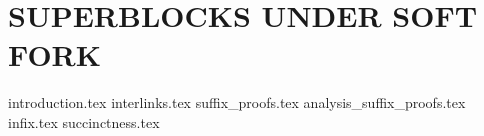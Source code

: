 \chapter{SUPERBLOCKS UNDER SOFT FORK}

{introduction.tex} 
{interlinks.tex} 
{suffix_proofs.tex}
{analysis_suffix_proofs.tex}
{infix.tex}
{succinctness.tex}
